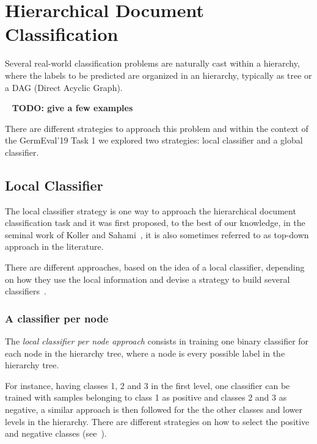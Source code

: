 \documentclass[11pt,a4paper]{article}
\begin{document}


\section{Hierarchical Document Classification}\label{hierarchical-clf}


Several real-world classification problems are naturally cast within a hierarchy,
where the labels to be predicted are organized in an hierarchy, typically as
tree or a DAG (Direct Acyclic Graph).

\ \newline
\textbf{TODO: give a few examples}
\ \newline

There are different strategies to approach this problem and within the context
of the GermEval'19 Task 1 we explored two strategies: local classifier and a
global classifier.


\subsection{Local Classifier}

The local classifier strategy is one way to approach the hierarchical document classification task
and it was first proposed, to the best of our knowledge, in the seminal work of Koller and
Sahami~, it is also sometimes referred to as top-down
approach in the literature.

There are different approaches, based on the idea of a local classifier, depending on how they use
the local information and devise a strategy to build several classifiers~\cite{Silla:2011:SHC:1937796.1937884}.


\subsubsection{A classifier per node} %
The \textit{local classifier per node approach} consists in training one binary classifier for each
node in the hierarchy tree, where a node is every possible label in the hierarchy tree.

For instance, having classes 1, 2 and 3 in the first level, one classifier can be trained with
samples belonging to class 1 as positive and classes 2 and 3 as negative, a similar approach is then
followed for the the other classes and lower levels in the hierarchy. There are different strategies
on how to select the positive and negative classes (see~\cite{}).
\end{document}
